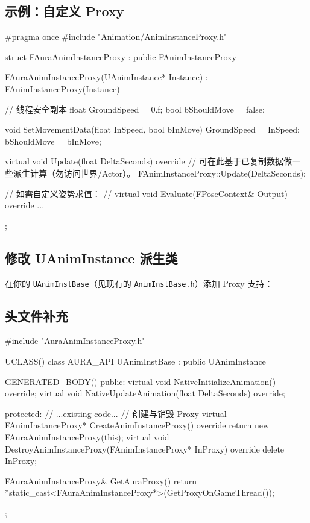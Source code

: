 \documentclass[10pt,openright,oneside,CJKmath]{MyBook}
\begin{document}
\subsection{示例：自定义 Proxy}
\begin{code}[caption={FAuraAnimInstanceProxy}]
#pragma once
#include "Animation/AnimInstanceProxy.h"

struct FAuraAnimInstanceProxy : public FAnimInstanceProxy
{
    FAuraAnimInstanceProxy(UAnimInstance* Instance)
        : FAnimInstanceProxy(Instance)
    {}

    // 线程安全副本
    float GroundSpeed = 0.f;
    bool  bShouldMove = false;

    void SetMovementData(float InSpeed, bool bInMove)
    {
        GroundSpeed = InSpeed;
        bShouldMove = bInMove;
    }

    virtual void Update(float DeltaSeconds) override
    {
        // 可在此基于已复制数据做一些派生计算（勿访问世界/Actor）。
        FAnimInstanceProxy::Update(DeltaSeconds);
    }

    // 如需自定义姿势求值：
    // virtual void Evaluate(FPoseContext& Output) override { ... }
};
\end{code}

\subsection{修改 UAnimInstance 派生类}
在你的 \texttt{UAnimInstBase}（见现有的 \texttt{AnimInstBase.h}）添加 Proxy 支持：

\subsection*{头文件补充}
\begin{code}[caption={AnimInstBase.h 关键补充}]
#include "AuraAnimInstanceProxy.h"

UCLASS()
class AURA_API UAnimInstBase : public UAnimInstance
{
    GENERATED_BODY()
public:
    virtual void NativeInitializeAnimation() override;
    virtual void NativeUpdateAnimation(float DeltaSeconds) override;

protected:
    // ...existing code...
    // 创建与销毁 Proxy
    virtual FAnimInstanceProxy* CreateAnimInstanceProxy() override
    {
        return new FAuraAnimInstanceProxy(this);
    }
    virtual void DestroyAnimInstanceProxy(FAnimInstanceProxy* InProxy) override
    {
        delete InProxy;
    }

    FAuraAnimInstanceProxy& GetAuraProxy()
    {
        return *static_cast<FAuraAnimInstanceProxy*>(GetProxyOnGameThread());
    }
};
\end{code}
\end{document}
